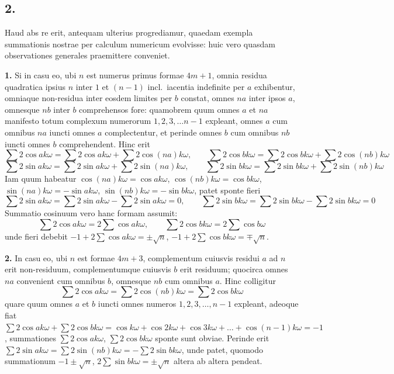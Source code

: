\documentclass[12pt,a4paper]{article}
\theoremstyle{plain}
\begin{document}
\subsection*{2.}

Haud abs re erit, antequam ulterius progrediamur, quaedam exempla summationis nostrae per calculum numericum evolvisse: huic vero quasdam observationes generales praemittere conveniet.

\medskip
\noindent\textbf{1.} Si in casu eo, ubi $n$ est numerus primus formae $4m+1$, omnia residua quadratica ipsius $n$ inter $1$ et $(n-1)$ incl.\ iacentia indefinite per $a$ exhibentur, omniaque non-residua inter eosdem limites per $b$ constat, omnes $na$ inter ipsos $a$, omnesque $nb$ inter $b$ comprehensos fore: quamobrem quum omnes $a$ et $na$ manifesto totum complexum numerorum $1, 2, 3, \ldots n-1$ expleant, omnes $a$ cum omnibus $na$ iuncti omnes $a$ complectentur, et perinde omnes $b$ cum omnibus $nb$ iuncti omnes $b$ comprehendent. Hinc erit
\[
\sum 2\cos ak\omega = \sum 2\cos ak\omega + \sum 2\cos (na)k\omega, \qquad \sum 2\cos bk\omega = \sum 2\cos bk\omega + \sum 2\cos (nb)k\omega
\]
\[
\sum 2\sin ak\omega = \sum 2\sin ak\omega + \sum 2\sin (na)k\omega, \qquad \sum 2\sin bk\omega = \sum 2\sin bk\omega + \sum 2\sin (nb)k\omega
\]
Iam quum habeatur $\cos(na)k\omega = \cos ak\omega$, $\cos(nb)k\omega = \cos bk\omega$, $\sin(na)k\omega = -\sin ak\omega$, $\sin(nb)k\omega = -\sin bk\omega$, patet sponte fieri
\[
\sum 2\sin ak\omega = \sum 2\sin ak\omega - \sum 2\sin ak\omega = 0, \qquad \sum 2\sin bk\omega = \sum 2\sin bk\omega - \sum 2\sin bk\omega = 0
\]
Summatio cosinuum vero hanc formam assumit:
\[
\sum 2\cos ak\omega = 2\sum \cos ak\omega, \qquad \sum 2\cos bk\omega = 2\sum \cos b\omega
\]
unde fieri debebit $-1 + 2\sum \cos ak\omega = \pm\sqrt{n}$, $-1 + 2\sum \cos bk\omega = \mp\sqrt{n}$.

\medskip
\noindent\textbf{2.} In casu eo, ubi $n$ est formae $4m+3$, complementum cuiusvis residui $a$ ad $n$ erit non-residuum, complementumque cuiusvis $b$ erit residuum; quocirca omnes $na$ convenient cum omnibus $b$, omnesque $nb$ cum omnibus $a$. Hinc colligitur
\[
\sum 2\cos ak\omega = \sum 2\cos (nb)k\omega = \sum 2\cos bk\omega
\]
quare quum omnes $a$ et $b$ iuncti omnes numeros $1, 2, 3, \ldots, n-1$ expleant, adeoque fiat $\sum 2\cos ak\omega + \sum 2\cos bk\omega = \cos k\omega + \cos 2k\omega + \cos 3k\omega + \ldots + \cos(n-1)k\omega = -1$, summationes $\sum 2\cos ak\omega$, $\sum 2\cos bk\omega$ sponte sunt obviae. Perinde erit $\sum 2\sin ak\omega = \sum 2\sin(nb)k\omega = -\sum 2\sin bk\omega$, unde patet, quomodo summationum $-1 \pm \sqrt{n}$, $2\sum \sin bk\omega = \pm\sqrt{n}$ altera ab altera pendeat.
\end{document}
